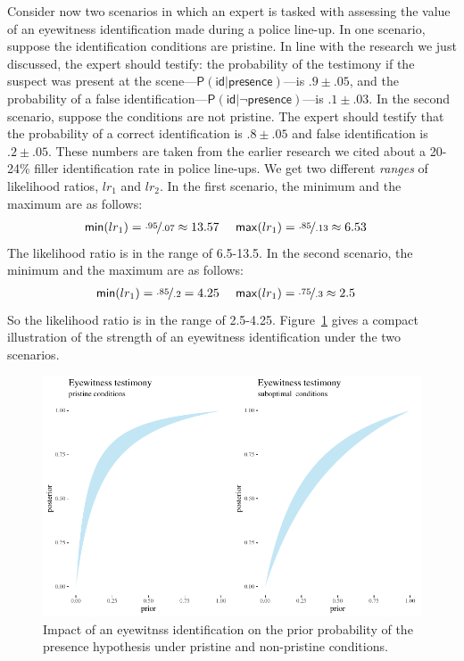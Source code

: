 \documentclass[
  letterpaper,
  DIV=11,
  numbers=noendperiod]{scrartcl}
\newcommand{\pr}[1]{\mathsf{P}(#1)}
\begin{document}
Consider now two scenarios in which an expert is tasked with assessing
the value of an eyewitness identification made during a police line-up.
In one scenario, suppose the identification conditions are pristine. In
line with the research we just discussed, the expert should testify: the
probability of the testimony if the suspect was present at the
scene---\(\pr{\textsf{id} \vert \textsf{presence}}\)---is
\(.9 \pm .05\), and the probability of a false
identification---\(\pr{\textsf{id} \vert \neg \textsf{presence}}\)---is
\(.1\pm .03\). In the second scenario, suppose the conditions are not
pristine. The expert should testify that the probability of a correct
identification is \(.8 \pm .05\) and false identification is
\(.2 \pm .05\). These numbers are taken from the earlier research we
cited about a 20-24\% filler identification rate in police line-ups. We
get two different \emph{ranges} of likelihood ratios, \(lr_1\) and
\(lr_2\). In the first scenario, the minimum and the maximum are as
follows: \begin{align*}
\mathsf{min}(lr_1) = \nicefrac{.95}{.07} \approx 13.57  & \,\,\,\,\,\,\,\,  \mathsf{max}(lr_1) = \nicefrac{.85}{.13} \approx 6.53  
\end{align*} \noindent The likelihood ratio is in the range of 6.5-13.5.
In the second scenario, the minimum and the maximum are as follows:
\begin{align*}
\mathsf{min}(lr_1) = \nicefrac{.85}{.2} =  4.25 &  \,\,\,\,\,\,\,\,   \mathsf{max}(lr_1) = \nicefrac{.75}{.3} \approx 2.5  
\end{align*} \noindent So the likelihood ratio is in the range of
2.5-4.25. Figure~\ref{fig-eyewitness3b} gives a compact illustration of
the strength of an eyewitness identification under the two scenarios.

\begin{figure}[h]

{\centering \includegraphics[width=1\textwidth,height=\textheight]{Quart_lr-chapter6_files/figure-pdf/fig-eyewitness3b-1.pdf}

}

\caption{\label{fig-eyewitness3b}Impact of an eyewitnss identification
on the prior probability of the presence hypothesis under pristine and
non-pristine conditions.}

\end{figure}
\end{document}
